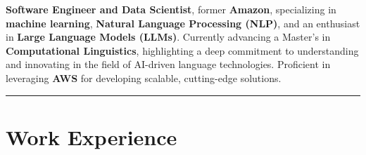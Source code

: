\documentclass[10pt,a4paper]{article}
\begin{document}
\textbf{Software Engineer and Data Scientist}, former \textbf{Amazon}, specializing in \textbf{machine learning}, \textbf{Natural Language Processing (NLP)}, and an enthusiast in \textbf{Large Language Models (LLMs)}. Currently advancing a Master's in \textbf{Computational Linguistics}, highlighting a deep commitment to understanding and innovating in the field of AI-driven language technologies. Proficient in leveraging \textbf{AWS} for developing scalable, cutting-edge solutions.

\rule{\textwidth}{0.4pt} 

\section*{Work Experience}
\end{document}
